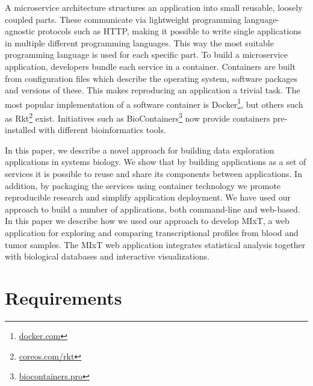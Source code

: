A microservice architecture structures an application into small reusable,
loosely coupled parts. These communicate via lightweight programming
language-agnostic protocols such as HTTP, making it possible to write single
applications in multiple different programming languages. This way the
most suitable programming language is used for each specific part. To build a
microservice application, developers bundle each service in a container.
Containers are built from configuration files which describe the operating
system, software packages and versions of these. 
This makes reproducing an
application a trivial task. The most popular implementation of a software
container is Docker\footnote{\url{docker.com}}, but others such as
Rkt\footnote{\url{coreos.com/rkt}} exist. Initiatives such as
BioContainers\footnote{\url{biocontainers.pro}} now provide containers
pre-installed with different bioinformatics tools. 


In this paper, we describe a novel approach for building data exploration
applications in systems biology. We show that by building applications as a set
of services it is possible to reuse and share its components between
applications. In addition, by packaging the services using container technology
we promote reproducible research and simplify application deployment. We have
used our approach to build a number of applications, both command-line and
web-based. In this paper we describe how we used our approach to develop MIxT,
a web application for exploring and comparing transcriptional profiles from
blood and tumor samples. The MIxT web application integrates statistical
analysis together with biological databases and interactive visualizations.


\section*{Requirements} 

